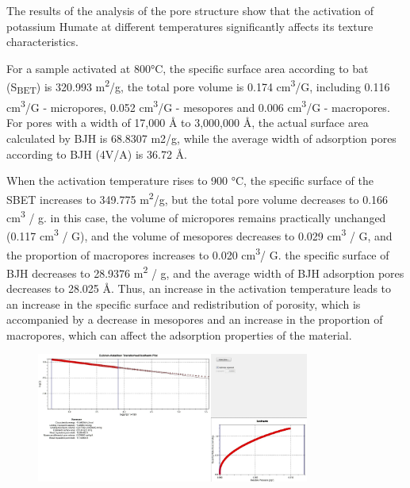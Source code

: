 The results of the analysis of the pore structure show that the
activation of potassium Humate at different temperatures significantly
affects its texture characteristics.

For a sample activated at 800°C, the specific surface area according to
bat (S\textsubscript{BET}) is 320.993 m\textsuperscript{2}/g, the total
pore volume is 0.174 cm\textsuperscript{3}/G, including 0.116
cm\textsuperscript{3}/G - micropores, 0.052 cm\textsuperscript{3}/G -
mesopores and 0.006 cm\textsuperscript{3}/G - macropores. For pores with
a width of 17,000 Å to 3,000,000 Å, the actual surface area calculated
by BJH is 68.8307 m2/g, while the average width of adsorption pores
according to BJH (4V/A) is 36.72 Å.

When the activation temperature rises to 900 °C, the specific surface of
the SBET increases to 349.775 m\textsuperscript{2}/g, but the total pore
volume decreases to 0.166 cm\textsuperscript{3} / g. in this case, the
volume of micropores remains practically unchanged (0.117
cm\textsuperscript{3} / G), and the volume of mesopores decreases to
0.029 cm\textsuperscript{3} / G, and the proportion of macropores
increases to 0.020 cm\textsuperscript{3}/ G. the specific surface of BJH
decreases to 28.9376 m\textsuperscript{2} / g, and the average width of
BJH adsorption pores decreases to 28.025 Å. Thus, an increase in the
activation temperature leads to an increase in the specific surface and
redistribution of porosity, which is accompanied by a decrease in
mesopores and an increase in the proportion of macropores, which can
affect the adsorption properties of the material.

\begin{figure}[H]
	\centering
	\includegraphics[width=0.8\textwidth]{media/chem2/image104}
	\caption*{}
\end{figure}

